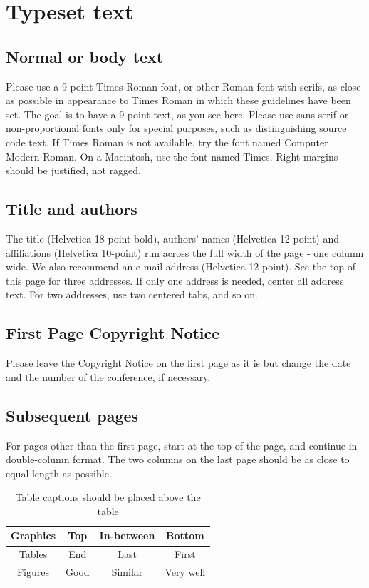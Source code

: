 \documentclass[acmtog, authorversion]{acmart}
\begin{document}
\section{Typeset text}
\subsection{Normal or body text}
Please use a 9-point Times Roman font, or other Roman font with 
serifs, as close as possible in appearance to Times Roman in which 
these guidelines have been set. The goal is to have a 9-point text, 
as you see here. Please use sans-serif or non-proportional fonts 
only for special purposes, such as distinguishing source code text. 
If Times Roman is not available, try the font named Computer Modern
Roman. On a Macintosh, use the font named Times. Right margins 
should be justified, not ragged.

\subsection{Title and authors}
The title (Helvetica 18-point bold), authors' names (Helvetica 
12-point) and affiliations (Helvetica 10-point) run across the full 
width of the page - one column wide. We also recommend an  e-mail 
address (Helvetica 12-point). See the top of this page for three 
addresses. If only one address is needed, center all address text. 
For two addresses, use two centered tabs, and so on.

\subsection{First Page Copyright Notice}
Please leave the Copyright Notice on the first page as it is but 
change the date and the number of the conference, if necessary.

\subsection{Subsequent pages}
For pages other than the first page, start at the top of the page, and 
continue in double-column format.  The two columns on the last page 
should be as close to equal length as possible.

\begin{table}
\centering \caption{Table captions should be placed above the table}
\begin{tabular}{|c|c|c|c|} \hline
\textbf{Graphics} & \textbf{Top} & \textbf{In-between} & \textbf{Bottom}\\ \hline 
Tables&End&Last&First\\ \hline 
Figures&Good&Similar&Very well\\
\hline\end{tabular}
\end{table}
\end{document}
